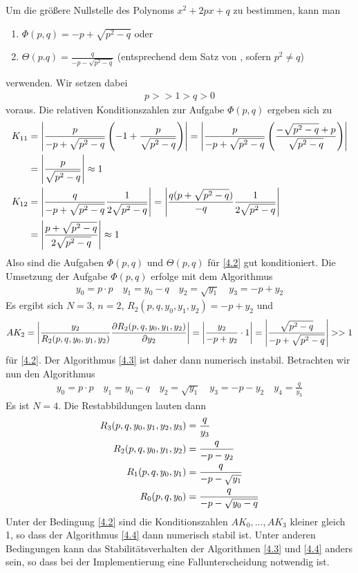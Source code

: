 \begin{example}
	Um die größere Nullstelle des Polynoms $x^2+2px+q$ zu bestimmen, kann man 
	\begin{enumerate}[label=(\alph*)]
		\item $\Phi(p,q)=-p+\sqrt{p^2-q}$ oder
		\item $\Theta(p.q)=\frac{q}{-p-\sqrt{p^2-q}}$ (entsprechend dem Satz von , sofern $p^2\neq q$)
	\end{enumerate}
	verwenden. Wir setzen dabei 
	\begin{align}
		\label{4.2}
		p>>1>q>0
	\end{align}
	voraus. Die relativen Konditionszahlen zur Aufgabe $\Phi(p,q)$ ergeben sich zu
	\begin{align}
		K_{11} &= \left|\frac{p}{-p+\sqrt{p^2-q}}\left(-1+\frac{p}{\sqrt{p^2-q}}\right)\right| = \left|\frac{p}{-p+\sqrt{p^2-q}}\left(\frac{-\sqrt{p^2-q}+p}{\sqrt{p^2-q}}\right)\right| \notag \\
		&= \left|\frac{p}{\sqrt{p^2-q}}\right|\approx 1\notag \\
		K_{12} &= \left|\frac{q}{-p+\sqrt{p^2-q}}\frac{1}{2\sqrt{p^2-q}}\right| = \left|\frac{q(p+\sqrt{p^2-q})}{-q} \frac{1}{2\sqrt{p^2-q}}\right| \notag \\
		&= \left|\frac{p+\sqrt{p^2-q}}{2\sqrt{p^2-q}}\right| \approx 1\notag
	\end{align}
	Also sind die Aufgaben $\Phi(p,q)$ und $\Theta(p,q)$ für \cref{4.2} gut konditioniert. Die Umsetzung der Aufgabe $\Phi(p,q)$ erfolge mit dem Algorithmus 
	\begin{align}
		\label{4.3}
		y_0 = p\cdot p\quad y_1 = y_0-q\quad y_2 = \sqrt{y_1}\quad y_3=-p+y_2
	\end{align}
	Es ergibt sich $N=3$, $n=2$, $R_2(p,q,y_0,y_1,y_2)=-p+y_2$ und
	\begin{align}
		AK_2 = \left|\frac{y_2}{R_2(p,q,y_0,y_1,y_2)}\frac{\partial R_2(p,q,y_0,y_1,y_2)}{\partial y_2}\right| = \left|\frac{y_2}{-p+y_2}\cdot 1\right| = \left|\frac{\sqrt{p^2-q}}{-p+\sqrt{p^2-q}}\right| >>1\notag
	\end{align}
	für \cref{4.2}. Der Algorithmus \cref{4.3} ist daher dann numerisch instabil. Betrachten wir nun den Algorithmus 
	\begin{align}
		\label{4.4}
		y_0 = p\cdot p\quad y_1=y_0-q\quad y_2=\sqrt{y_1}\quad y_3 = -p-y_2\quad y_4 = \frac{q}{y_3}
	\end{align}
	Es ist $N=4$. Die Restabbildungen lauten dann
	\begin{align}
		R_3(p,q,y_0,y_1,y_2,y_3) &= \frac{q}{y_3} \notag \\
		R_2(p,q,y_0,y_1,y_2) &= \frac{q}{-p-y_2} \notag \\
		R_1(p,q,y_0,y_1) &= \frac{q}{-p-\sqrt{y_1}} \notag \\
		R_0(p,q,y_0) &= \frac{q}{-p-\sqrt{y_0-q}} \notag 
	\end{align}
	Unter der Bedingung \cref{4.2} sind die Konditionszahlen $AK_0,...,AK_3$ kleiner gleich 1, so dass der Algorithmus \cref{4.4} dann numerisch stabil ist. Unter anderen Bedingungen kann das Stabilitätsverhalten der Algorithmen \cref{4.3} und \cref{4.4} anders sein, so dass bei der Implementierung eine Fallunterscheidung notwendig ist.
\end{example}